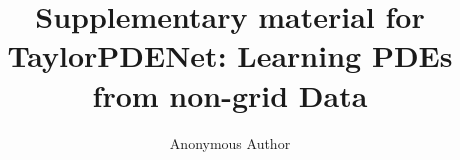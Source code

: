 \documentclass[runningheads]{llncs}
\begin{document}
%
\title{Supplementary material for TaylorPDENet: Learning PDEs from non-grid Data}
%
%



\author{Anonymous Author}
%
%
\institute{***}



\maketitle              %
%

%
%
%
\appendix
\end{document}
